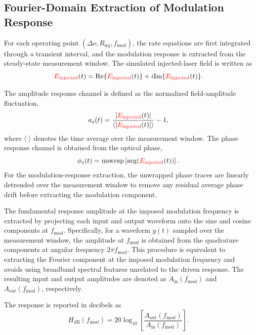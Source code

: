 \documentclass[
 aip,
 apl,
 amsmath,amssymb,
 preprint,
 floatfix,
]{revtex4-1}
\begin{document}
\subsection{Fourier-Domain Extraction of Modulation Response}


For each operating point $(\Delta\nu, R_{\mathrm{inj}}, f_{\mathrm{mod}})$, the rate equations are first integrated through a transient interval, and the modulation response is extracted from the steady-state measurement window. The simulated injected-laser field is written as
\begin{equation}
\textcolor{red}{E_{\mathrm{injected}}}(t)=\mathrm{Re}\{\textcolor{red}{E_{\mathrm{injected}}}(t)\}+i\mathrm{Im}\{\textcolor{red}{E_{\mathrm{injected}}}(t)\}.
\end{equation}

The amplitude response channel is defined as the normalized field-amplitude fluctuation,
\begin{equation}
a_s(t)=\frac{|\textcolor{red}{E_{\mathrm{injected}}}(t)|}{\langle |\textcolor{red}{E_{\mathrm{injected}}}(t)| \rangle}-1,
\end{equation}
where $\langle \cdot \rangle$ denotes the time average over the measurement window. The phase response channel is obtained from the optical phase,
\begin{equation}
\phi_s(t)=\mathrm{unwrap}\left[\arg(\textcolor{red}{E_{\mathrm{injected}}}(t))\right].
\end{equation}
For the modulation-response extraction, the unwrapped phase traces are linearly detrended over the measurement window to remove any residual average phase drift before extracting the modulation component.

The fundamental response amplitude at the imposed modulation frequency is extracted by projecting each input and output waveform onto the sine and cosine components at $f_{\mathrm{mod}}$. Specifically, for a waveform $y(t)$ sampled over the measurement window, the amplitude at $f_{\mathrm{mod}}$ is obtained from the quadrature components at angular frequency $2\pi f_{\mathrm{mod}}$. This procedure is equivalent to extracting the Fourier component at the imposed modulation frequency and avoids using broadband spectral features unrelated to the driven response. The resulting input and output amplitudes are denoted as $A_{\mathrm{in}}(f_{\mathrm{mod}})$ and $A_{\mathrm{out}}(f_{\mathrm{mod}})$, respectively.

The response is reported in decibels as
\begin{equation}
H_{\mathrm{dB}}(f_{\mathrm{mod}})
=
20\log_{10}
\left[
\frac{
A_{\mathrm{out}}(f_{\mathrm{mod}})
}{
A_{\mathrm{in}}(f_{\mathrm{mod}})
}
\right].
\end{equation}
\end{document}
